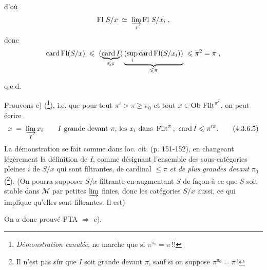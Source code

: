 \setcounter{footnote}{11}


d'où
\[
\operatorname{Fl}\,S/x \;\simeq\; \varinjlim_{i} \operatorname{Fl}\,S/x_i \;,
\]
donc
\[
\operatorname{card}\operatorname{Fl}(S/x) \;\leqslant\; (\underbrace{\operatorname{card} I}_{\leqslant\pi})\underbrace{(\sup_{i}\operatorname{card}\operatorname{Fl}(S/x_i))}_{\leqslant\pi} \;\leqslant \pi^2 = \pi \;,
\]

\hfill q.e.d.

Prouvons c) (\footnote{\textit{Démonstration canulée}, ne marche que si $\pi^{\pi_0} = \pi$\,!!}), i.e. que pour tout $\pi' > \pi \geqslant \pi_0$ et tout $x \in \mathrm{Ob}\,\operatorname{Filt}^{\pi'}$, on peut écrire
\[
x \;=\; \varinjlim_{I} x_i \qquad I \text{ grande devant } \pi\text{, les } x_i \text{ dans } \Filt^{\pi}\text{, } \card I \leqslant \pi'^{\pi}. \tag*{(4.3.6.5)}
\]
La démonstration se fait comme dans loc. cit. (p. 151-152), en changeant légèrement la définition de $I$, comme désignant l'ensemble des sous-catégories pleines $i$ de $S/x$ qui sont filtrantes, de cardinal $\leqslant \pi$ \textit{et de plus grandes devant} $\pi_0$ (\footnote{Il n'est pas sûr que $I$ soit grande devant $\pi$, sauf si on suppose $\pi^{\pi_0} = \pi$\,!}). (On pourra supposer $S/x$ filtrante en augmentant $S$ de façon à ce que $S$ soit stable dans $\mathcal{M}$ par petites $\varinjlim$ finies, donc les catégories $S/x$ aussi, ce qui implique qu'elles sont filtrantes. Il est)

On a donc prouvé PTA $\Longrightarrow$ c).

